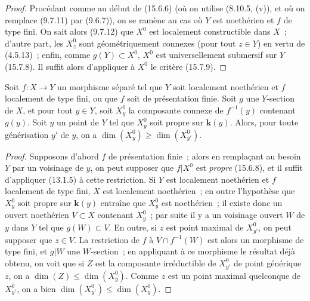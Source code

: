 \begin{proof}
Procédant comme au début de (15.6.6) (où on utilise (8.10.5, (v)), et où on remplace (9.7.11) par (9.6.7)), on se ramène au cas où $Y$ est noethérien et $f$ de type fini. On sait alors (9.7.12) que $X^0$ est localement constructible dans $X$~; d'autre part, les $X_z^0$ sont géométriquement connexes (pour tout $z\in Y$) en vertu de (4.5.13)~; enfin, comme $g(Y)\subset X^0$, $X^0$ est universellement submersif sur $Y$ (15.7.8). Il suffit alors d'appliquer à $X^0$ le critère (15.7.9).
\end{proof}

\begin{corollary}[15.6.9]
\label{IV.15.6.9-fr}
Soit $f:X\to Y$ un morphisme séparé tel que $Y$ soit localement noethérien et $f$ localement de type fini, ou que $f$ soit de présentation finie. Soit $g$ une $Y$-section de $X$, et pour tout $y\in Y$, soit $X_y^0$ la composante connexe de $f^{-1}(y)$ contenant $g(y)$. Soit $y$ un point de $Y$ tel que $X_y^0$ soit propre sur $\mathbf{k}(y)$. Alors, pour toute générisation $y'$ de $y$, on a $\dim(X_y^0)\geqslant\dim(X_{y'}^0)$.
\end{corollary}

\begin{proof}
Supposons d'abord $f$ de présentation finie~; alors en remplaçant au besoin $Y$ par un voisinage de $y$, on peut supposer que $f|X^0$ est \emph{propre} (15.6.8), et il suffit d'appliquer (13.1.5) à cette restriction. Si $Y$ est localement noethérien et $f$ localement de type fini, $X$ est localement noethérien~; en outre l'hypothèse que $X_y^0$ soit propre sur $\mathbf{k}(y)$ entraîne que $X_y^0$ est noethérien~; il existe donc un ouvert noethérien $V\subset X$ contenant $X_y^0$~; par suite il y a un voisinage ouvert $W$ de $y$ dans $Y$ tel que $g(W)\subset V$. En outre, si $z$ est point maximal de $X_{y'}^0$, on peut supposer que $z\in V$. La restriction de $f$ à $V\cap f^{-1}(W)$ est alors un morphisme de type fini, et $g|W$ une $W$-section~; en appliquant à ce morphisme le résultat déjà obtenu, on voit que si $Z$ est la composante irréductible de $X_{y'}^0$ de point générique $z$, on a $\dim(Z)\leqslant\dim(X_y^0)$. Comme $z$ est un point maximal quelconque de $X_{y'}^0$, on a bien $\dim(X_{y'}^0)\leqslant\dim(X_y^0)$.
\end{proof}

